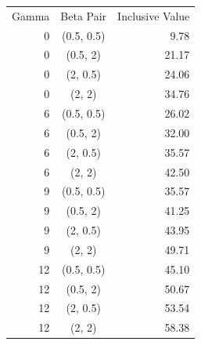\begin{tabular}{rcr}
Gamma & Beta Pair & Inclusive Value \\
0 & (0.5, 0.5) & 9.78 \\
0 & (0.5, 2) & 21.17 \\
0 & (2, 0.5) & 24.06 \\
0 & (2, 2) & 34.76 \\
6 & (0.5, 0.5) & 26.02 \\
6 & (0.5, 2) & 32.00 \\
6 & (2, 0.5) & 35.57 \\
6 & (2, 2) & 42.50 \\
9 & (0.5, 0.5) & 35.57 \\
9 & (0.5, 2) & 41.25 \\
9 & (2, 0.5) & 43.95 \\
9 & (2, 2) & 49.71 \\
12 & (0.5, 0.5) & 45.10 \\
12 & (0.5, 2) & 50.67 \\
12 & (2, 0.5) & 53.54 \\
12 & (2, 2) & 58.38 \\
\end{tabular}